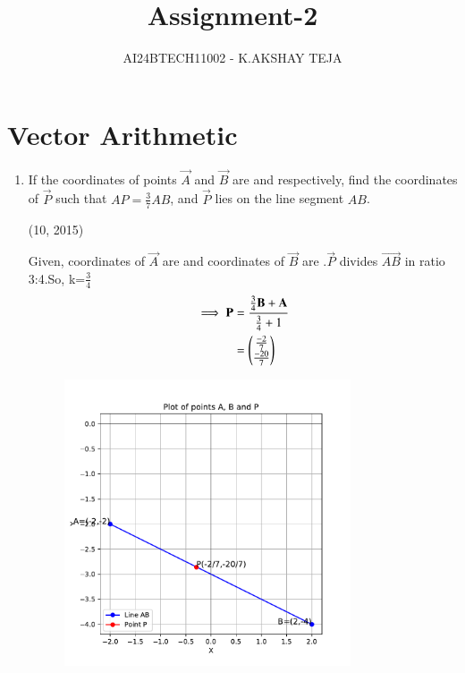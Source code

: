 \documentclass[journal]{IEEEtran}
\begin{document}

\onecolumn
\newpage
\title{Assignment-2}
\author{AI24BTECH11002 - K.AKSHAY TEJA}
\maketitle




\section{Vector Arithmetic}
\begin{enumerate}
 \item If the coordinates of points $\vec{A}$ and $\vec{B}$ are  and  respectively, find the coordinates of $\vec{P}$ such that $AP = \frac{3}{7} AB$, and $\vec{P}$ lies on the line segment $AB$. 
 
    \hfill {(10, 2015)}

 \solution
 Given, coordinates of $\vec{A}$ are  and coordinates of $\vec{B}$ are .$\vec{P}$ divides $\vec{AB}$ in ratio 3:4.So, k=$\frac{3}{4}$
 \begin{align*}
	 \implies \mathbf{P} &= \frac{\frac{3}{4}\mathbf{B} + \mathbf{A}}{\frac{3}{4} + 1} \\
	 &= \begin{pmatrix}\frac{-2}{7}\\\frac{-20}{7}\end{pmatrix} 
 \end{align*}
		\begin{figure}[h]    
	  \begin{center}
		\includegraphics[width=0.8\textwidth]{Fig.pdf}
	 \end{center}	  
	\end{figure}
\end{enumerate}
\end{document}
